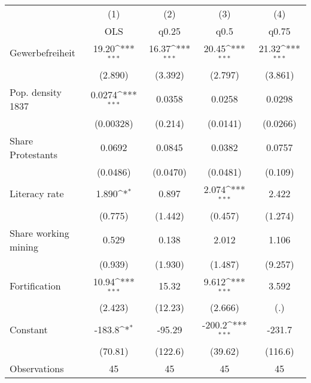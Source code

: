 {
\def\sym#1{\ifmmode^{#1}\else\(^{#1}\)\fi}
\begin{tabular}{l*{4}{c}}
\hline\hline
                    &\multicolumn{1}{c}{(1)}&\multicolumn{1}{c}{(2)}&\multicolumn{1}{c}{(3)}&\multicolumn{1}{c}{(4)}\\
                    &\multicolumn{1}{c}{OLS}&\multicolumn{1}{c}{q0.25}&\multicolumn{1}{c}{q0.5}&\multicolumn{1}{c}{q0.75}\\
\hline
Gewerbefreiheit     &       19.20\sym{***}&       16.37\sym{***}&       20.45\sym{***}&       21.32\sym{***}\\
                    &     (2.890)         &     (3.392)         &     (2.797)         &     (3.861)         \\
[1em]
Pop. density 1837   &      0.0274\sym{***}&      0.0358         &      0.0258         &      0.0298         \\
                    &   (0.00328)         &     (0.214)         &    (0.0141)         &    (0.0266)         \\
[1em]
Share Protestants   &      0.0692         &      0.0845         &      0.0382         &      0.0757         \\
                    &    (0.0486)         &    (0.0470)         &    (0.0481)         &     (0.109)         \\
[1em]
Literacy rate       &       1.890\sym{*}  &       0.897         &       2.074\sym{***}&       2.422         \\
                    &     (0.775)         &     (1.442)         &     (0.457)         &     (1.274)         \\
[1em]
Share working mining&       0.529         &       0.138         &       2.012         &       1.106         \\
                    &     (0.939)         &     (1.930)         &     (1.487)         &     (9.257)         \\
[1em]
Fortification       &       10.94\sym{***}&       15.32         &       9.612\sym{***}&       3.592         \\
                    &     (2.423)         &     (12.23)         &     (2.666)         &         (.)         \\
[1em]
Constant            &      -183.8\sym{*}  &      -95.29         &      -200.2\sym{***}&      -231.7         \\
                    &     (70.81)         &     (122.6)         &     (39.62)         &     (116.6)         \\
\hline
Observations        &          45         &          45         &          45         &          45         \\
\hline\hline
\end{tabular}
}
